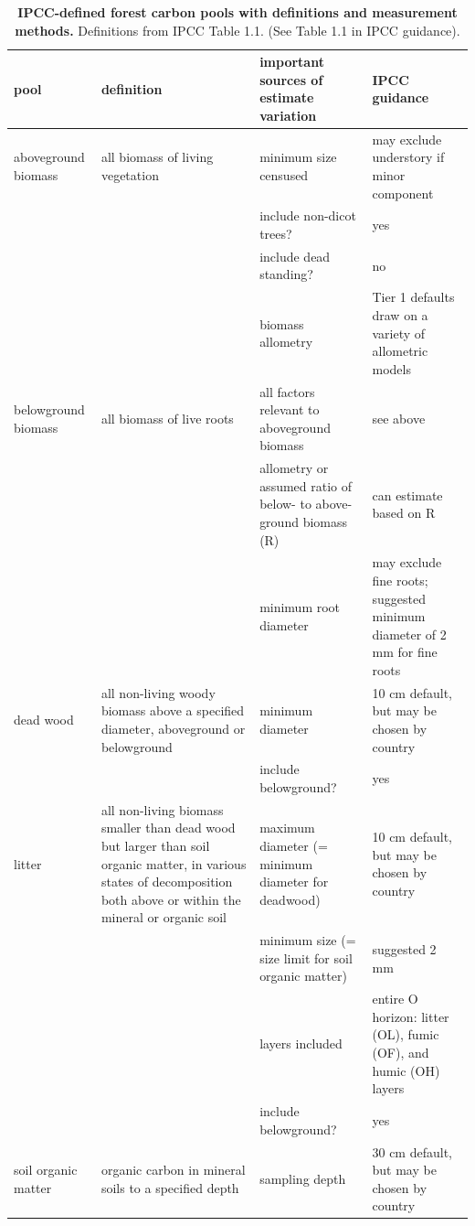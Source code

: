\documentclass[, manuscript]{copernicus}
\begin{document}
\begin{table}
\caption{\label{tab:table_pools}\textbf{IPCC-defined forest carbon pools with definitions and measurement methods.} Definitions from IPCC Table 1.1. (See Table 1.1 in IPCC guidance).}
\centering
\begin{tabu} to 
\hline
\textbf{pool} & \textbf{definition} & \textbf{important sources of estimate variation} & \textbf{IPCC guidance}\\
\hline
aboveground biomass & all biomass of living vegetation & minimum size censused & may exclude understory if minor component\\
\hline
 &  & include non-dicot trees? & yes\\
\hline
 &  & include dead standing? & no\\
\hline
 &  & biomass allometry & Tier 1 defaults draw on a variety of allometric models\\
\hline
belowground biomass & all biomass of live roots & all factors relevant to aboveground biomass & see above\\
\hline
 &  & allometry or assumed ratio of below- to above-ground biomass (R) & can estimate based on R\\
\hline
 &  & minimum root diameter & may exclude fine roots; suggested minimum diameter of 2 mm for fine roots\\
\hline
dead wood & all non-living woody biomass above a specified diameter, aboveground or belowground & minimum diameter & 10 cm default, but may be chosen by country\\
\hline
 &  & include belowground? & \vphantom{1} yes\\
\hline
litter & all non-living biomass smaller than dead wood but larger than soil organic matter, in various states of decomposition both above or within the mineral or organic soil & maximum diameter (= minimum diameter for deadwood) & 10 cm default, but may be chosen by country\\
\hline
 &  & minimum size (= size limit for soil organic matter) & suggested 2 mm\\
\hline
 &  & layers included & entire O horizon: litter (OL),  fumic (OF),  and  humic (OH) layers\\
\hline
 &  & include belowground? & yes\\
\hline
soil organic matter & organic carbon in mineral soils to a specified depth & sampling depth & 30 cm default, but may be chosen by country\\
\hline
\end{tabu}
\end{table}
\end{document}
